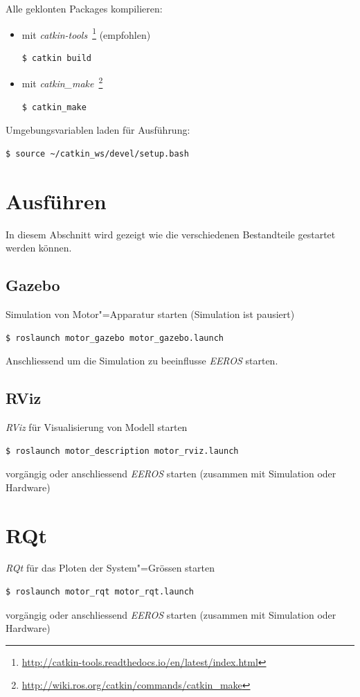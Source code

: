 Alle geklonten Packages kompilieren:
\begin{itemize}
\item mit \textit{catkin-tools}~\footnote{\url{http://catkin-tools.readthedocs.io/en/latest/index.html}} (empfohlen)
\begin{lstlisting}
$ catkin build
\end{lstlisting}
\item mit \textit{catkin\_make}~\footnote{\url{http://wiki.ros.org/catkin/commands/catkin\_make}}
\begin{lstlisting}
$ catkin_make
\end{lstlisting}
\end{itemize}

Umgebungsvariablen laden für Ausführung:
\begin{lstlisting}
$ source ~/catkin_ws/devel/setup.bash
\end{lstlisting}

\section{Ausführen}
In diesem Abschnitt wird gezeigt wie die verschiedenen Bestandteile gestartet werden können.
\subsection{Gazebo}
Simulation von Motor"=Apparatur starten (Simulation ist pausiert)
\begin{lstlisting}
$ roslaunch motor_gazebo motor_gazebo.launch
\end{lstlisting}

Anschliessend um die Simulation zu beeinflusse \textit{EEROS} starten.

\subsection{RViz}
\textit{RViz} für Visualisierung von Modell starten
\begin{lstlisting}
$ roslaunch motor_description motor_rviz.launch
\end{lstlisting}
vorgängig oder anschliessend \textit{EEROS} starten (zusammen mit Simulation oder Hardware)


\section{RQt}
\textit{RQt} für das Ploten der System"=Grössen starten
\begin{lstlisting}
$ roslaunch motor_rqt motor_rqt.launch
\end{lstlisting}
vorgängig oder anschliessend \textit{EEROS} starten (zusammen mit Simulation oder Hardware)
